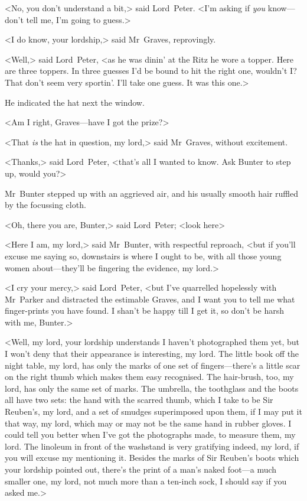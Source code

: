 <No, you don't understand a bit,> said Lord~Peter. <I'm asking if \textit{you} know—don't tell me, I'm going to guess.>

<I do know, your lordship,> said Mr~Graves, reprovingly.

<Well,> said Lord~Peter, <as he was dinin' at the Ritz he wore a topper. Here are three toppers. In three guesses I'd be bound to hit the right one, wouldn't I\@? That don't seem very sportin'. I'll take one guess. It was this one.>

He indicated the hat next the window.

<Am I right, Graves—have I got the prize?>

<That \textit{is} the hat in question, my lord,> said Mr~Graves, without excitement.

<Thanks,> said Lord~Peter, <that's all I wanted to know. Ask Bunter to step up, would you?>

Mr~Bunter stepped up with an aggrieved air, and his usually smooth hair ruffled by the focussing cloth.

<Oh, there you are, Bunter,> said Lord~Peter; <look here\longdash>

<Here I am, my lord,> said Mr~Bunter, with respectful reproach, <but if you'll excuse me saying so, downstairs is where I ought to be, with all those young women about—they'll be fingering the evidence, my lord.>

<I cry your mercy,> said Lord~Peter, <but I've quarrelled hopelessly with Mr~Parker and distracted the estimable Graves, and I want you to tell me what finger-prints you have found. I shan't be happy till I get it, so don't be harsh with me, Bunter.>

<Well, my lord, your lordship understands I haven't photographed them yet, but I won't deny that their appearance is interesting, my lord. The little book off the night table, my lord, has only the marks of one set of fingers—there's a little scar on the right thumb which makes them easy recognised. The hair-brush, too, my lord, has only the same set of marks. The umbrella, the toothglass and the boots all have two sets: the hand with the scarred thumb, which I take to be Sir Reuben's, my lord, and a set of smudges superimposed upon them, if I may put it that way, my lord, which may or may not be the same hand in rubber gloves. I could tell you better when I've got the photographs made, to measure them, my lord. The linoleum in front of the washstand is very gratifying indeed, my lord, if you will excuse my mentioning it. Besides the marks of Sir Reuben's boots which your lordship pointed out, there's the print of a man's naked foot—a much smaller one, my lord, not much more than a ten-inch sock, I should say if you asked me.>

